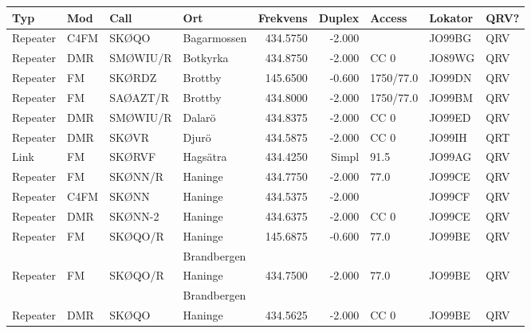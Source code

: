 \scriptsize

\begin{longtable}{llllrrlll}
\bf Typ  & \bf Mod     & \bf Call & \bf Ort     & \bf Frekvens & \bf Duplex & \bf Access & \bf Lokator & \bf QRV? \\ \hline
Repeater & C4FM        & SKØQO    & Bagarmossen & 434.5750     & -2.000     &            & JO99BG      & QRV      \\
Repeater & DMR         & SMØWIU/R & Botkyrka    & 434.8750     & -2.000     & CC 0       & JO89WG      & QRV      \\
Repeater & FM          & SKØRDZ   & Brottby     & 145.6500     & -0.600     & 1750/77.0  & JO99DN      & QRV      \\
Repeater & FM          & SAØAZT/R & Brottby     & 434.8000     & -2.000     & 1750/77.0  & JO99BM      & QRV      \\
Repeater & DMR         & SMØWIU/R & Dalarö      & 434.8375     & -2.000     & CC 0       & JO99ED      & QRV      \\
Repeater & DMR         & SKØVR    & Djurö       & 434.5875     & -2.000     & CC 0       & JO99IH      & QRT      \\
Link     & FM          & SKØRVF   & Hagsätra    & 434.4250     & Simpl      & 91.5       & JO99AG      & QRV      \\
Repeater & FM          & SKØNN/R  & Haninge     & 434.7750     & -2.000     & 77.0       & JO99CE      & QRV      \\
Repeater & C4FM        & SKØNN    & Haninge     & 434.5375     & -2.000     &            & JO99CF      & QRV      \\
Repeater & DMR         & SKØNN-2  & Haninge     & 434.6375     & -2.000     & CC 0       & JO99CE      & QRV      \\
Repeater & FM          & SKØQO/R  & Haninge     & 145.6875     & -0.600     & 77.0       & JO99BE      & QRV      \\
         &             &          & Brandbergen &              &            &            &             &          \\
Repeater & FM          & SKØQO/R  & Haninge     & 434.7500     & -2.000     & 77.0       & JO99BE      & QRV      \\
         &             &          & Brandbergen &              &            &            &             &          \\
Repeater & DMR         & SKØQO    & Haninge     & 434.5625     & -2.000     & CC 0       & JO99BE      & QRV      \\

\end{longtable}
